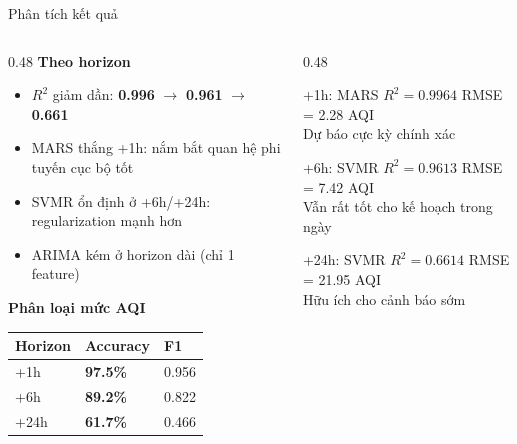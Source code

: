 \documentclass[aspectratio=169]{beamer}
\newcommand{\good}[1]{{\color{cgood}\textbf{#1}}}
\newcommand{\warn}[1]{{\color{cmoderate}\textbf{#1}}}
\newcommand{\bad}[1]{{\color{cunhealthy}\textbf{#1}}}
\begin{document}
\begin{frame}{Phân tích kết quả}
  \begin{columns}[T]
    \begin{column}{0.48\textwidth}
      \textbf{Theo horizon}
      \begin{itemize}
        \item $R^2$ giảm dần: \good{0.996} $\to$ \warn{0.961} $\to$ \bad{0.661}
        \item MARS thắng +1h: nắm bắt quan hệ phi tuyến cục bộ tốt
        \item SVMR ổn định ở +6h/+24h: regularization mạnh hơn
        \item ARIMA kém ở horizon dài (chỉ 1 feature)
      \end{itemize}
      \vspace{0.5em}
      \textbf{Phân loại mức AQI}
      \begin{center}
        \begin{tabular}{lll}
          \toprule
          Horizon & Accuracy & F1 \\
          \midrule
          +1h  & \good{97.5\%} & 0.956 \\
          +6h  & \warn{89.2\%} & 0.822 \\
          +24h & \bad{61.7\%}  & 0.466 \\
          \bottomrule
        \end{tabular}
      \end{center}
    \end{column}
    \begin{column}{0.48\textwidth}
      \begin{block}{+1h: MARS}
        \centering
        $R^2 = 0.9964$ \quad RMSE = 2.28 AQI\\
        \small Dự báo cực kỳ chính xác
      \end{block}
      \vspace{0.3em}
      \begin{block}{+6h: SVMR}
        \centering
        $R^2 = 0.9613$ \quad RMSE = 7.42 AQI\\
        \small Vẫn rất tốt cho kế hoạch trong ngày
      \end{block}
      \vspace{0.3em}
      \begin{block}{+24h: SVMR}
        \centering
        $R^2 = 0.6614$ \quad RMSE = 21.95 AQI\\
        \small Hữu ích cho cảnh báo sớm
      \end{block}
    \end{column}
  \end{columns}
\end{frame}
\end{document}
